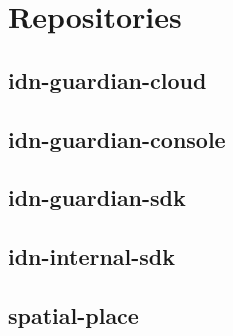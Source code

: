 \chapter{Repositories}
\label{appendix5-repositories}

\section*{idn-guardian-cloud}

\section*{idn-guardian-console}

\section*{idn-guardian-sdk}

\section*{idn-internal-sdk}

\section*{spatial-place}

